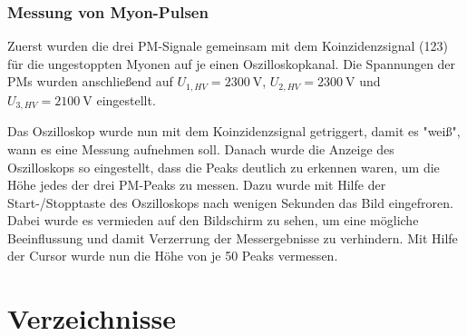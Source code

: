 \documentclass[slug=LM, room=Andreas-Schubert-Bau\,\ K\ 1A, supervisor=Anne-Sophie\ Berthold, coursedate=13.\ 12.\ 2019]{../../Lab_Report_LaTeX/lab_report}
\begin{document}
\subsubsection{Messung von Myon-Pulsen}
\label{sec:pulse}

Zuerst wurden die drei PM-Signale gemeinsam mit dem Koinzidenzsignal
(123) für die ungestoppten Myonen auf je einen Oszilloskopkanal. Die
Spannungen der PMs wurden anschließend auf
\(U_{1,HV} = \SI{2300}{\volt}\), \(U_{2,HV} = \SI{2300}{\volt}\) und
\(U_{3,HV} = \SI{2100}{\volt}\) eingestellt.

Das Oszilloskop wurde nun mit dem Koinzidenzsignal getriggert, damit
es "weiß", wann es eine Messung aufnehmen soll.  Danach wurde die
Anzeige des Oszilloskops so eingestellt, dass die Peaks deutlich zu
erkennen waren, um die Höhe jedes der drei PM-Peaks zu messen. Dazu
wurde mit Hilfe der Start-/Stopptaste des Oszilloskops nach wenigen
Sekunden das Bild eingefroren. Dabei wurde es vermieden auf den
Bildschirm zu sehen, um eine mögliche Beeinflussung und damit
Verzerrung der Messergebnisse zu verhindern. Mit Hilfe der Cursor wurde
nun die Höhe von je 50 Peaks vermessen.


\section{Verzeichnisse}

\label{sec:literatur}

\listoffigures

\listoftables

\printbibliography
\end{document}
